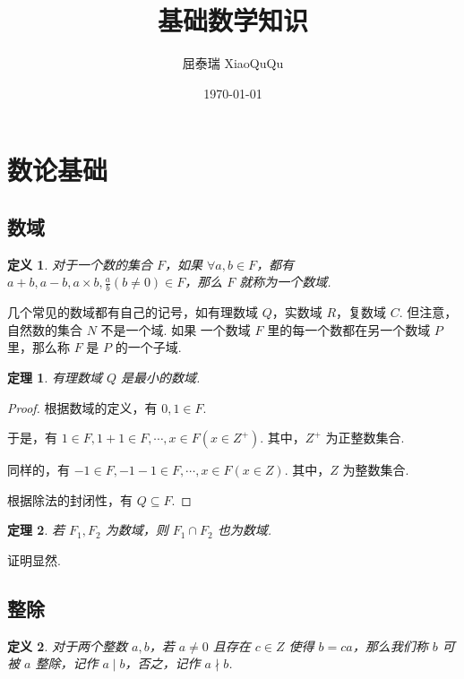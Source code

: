 \documentclass[a4paper]{article}
\title{基础数学知识}
\author{屈泰瑞 XiaoQuQu}
\date{\today}
\newtheorem{theorem}{定理}[section]
\newtheorem{definition}{定义}[section]
\begin{document}
\maketitle

\newpage

\section{数论基础}

\subsection{数域}

\begin{definition}
    对于一个数的集合 $F$，如果 $\forall a,b\in F$，都有 $a+b,a-b,a\times b,\frac
        {a}{b}(b\ne 0) \in F$，那么 $F$ 就称为一个数域.
\end{definition}

几个常见的数域都有自己的记号，如有理数域 $Q$，实数域 $R$，复数域 $C$. 但注意，自然数的集合 $N$ 不是一个域. 如果
一个数域 $F$ 里的每一个数都在另一个数域 $P$ 里，那么称 $F$ 是 $P$ 的一个子域.

\begin{theorem}
    有理数域 $Q$ 是最小的数域.
\end{theorem}

\begin{proof}
    根据数域的定义，有 $0,1\in F$.

    于是，有 $1\in F, 1+1\in F,\cdots, x\in F(x\in Z^+)$. 其中，$Z^+$ 为正整数集合.

    同样的，有 $-1\in F,-1-1\in F,\cdots, x\in F(x\in Z)$. 其中，$Z$ 为整数集合.

    根据除法的封闭性，有 $Q\subseteq F$.
\end{proof}

\begin{theorem}
    若 $F_1,F_2$ 为数域，则 $F_1 \cap F_2$ 也为数域.
\end{theorem}

证明显然.

\subsection{整除}

\begin{definition}
    对于两个整数 $a,b$，若 $a\ne 0$ 且存在 $c \in Z$ 使得 $b=ca$，那么我们称 $b$ 可被
    $a$ 整除，记作 $a\mid b$，否之，记作 $a \nmid b$.
\end{definition}
\end{document}
